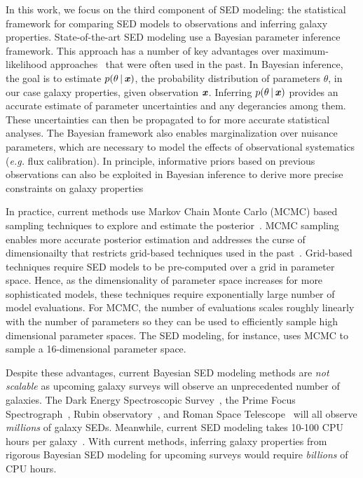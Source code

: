 In this work, we focus on the third component of SED modeling: the statistical
framework for comparing SED models to observations and inferring galaxy
properties. 
State-of-the-art SED modeling use a Bayesian parameter inference framework.
This approach has a number of key advantages over maximum-likelihood 
approaches~\citep[\emph{e.g.}][]{cidfernandes2005, tojeiro2007, koleva2008} 
that were often used in the past.
In Bayesian inference, the goal is to estimate $p(\theta\,|\,\textbf{\textit{x}})$, the
probability distribution of parameters $\theta$, in our case galaxy
properties, given observation $\textbf{\textit{x}}$. 
Inferring $p(\theta\,|\,\textbf{\textit{x}})$ provides an accurate estimate of parameter 
uncertainties and any degerancies among them.
These uncertainties can then be propagated to for more accurate statistical
analyses. 
The Bayesian framework also enables marginalization over nuisance parameters,
which are necessary to model the effects of observational systematics
(\emph{e.g.} flux calibration).
In principle, informative priors based on previous observations can also be
exploited in Bayesian inference to derive more precise constraints on galaxy
properties 

In practice, current methods use Markov Chain Monte Carlo (MCMC) based sampling
techniques to explore and estimate the
posterior~\citep{acquaviva2011, chevallard2016, carnall2017, leja2017}. 
MCMC sampling enables more accurate posterior estimation and addresses the
curse of dimensionailty that restricts grid-based techniques used in the
past~\citep{kauffmann2003a, burgarella2005, salim2007, dacunha2008}.
Grid-based techniques require SED models to be pre-computed over a grid in
parameter space.
Hence, as the dimensionality of parameter space increases for more
sophisticated models, these techniques require exponentially large number of
model evaluations. 
For MCMC, the number of evaluations scales roughly linearly with the number of
parameters so they can be used to efficiently sample high dimensional parameter
spaces. 
The \cite{johnson2021} SED modeling, for instance, uses MCMC to sample a
16-dimensional parameter space. 

Despite these advantages, current Bayesian SED modeling methods are \emph{not
scalable} as upcoming galaxy surveys will observe an unprecedented number of
galaxies.
The Dark Energy Spectroscopic Survey~\citep[DESI;][]{desicollaboration2016},
the Prime Focus Spectrograph~\citep[PFS;][]{takada2014},
Rubin observatory~\citep{ivezic2019}, and Roman Space
Telescope~\citep{spergel2015} will all observe \emph{millions} of galaxy SEDs. 
Meanwhile, current SED modeling takes 10-100 CPU hours per
galaxy~\citep[\emph{e.g.}][]{carnall2019, tacchella2021}.
With current methods, inferring galaxy properties from rigorous Bayesian SED
modeling for upcoming surveys  would require \emph{billions} of CPU hours. 

